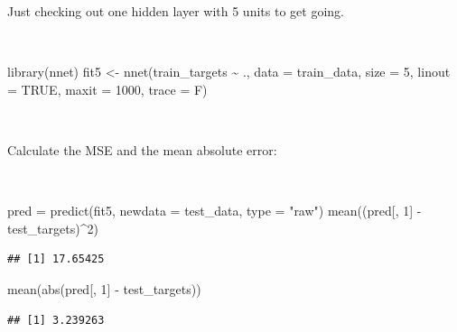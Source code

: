 \documentclass[
  10pt,
  ignorenonframetext,
]{beamer}
\newenvironment{Shaded}{\begin{snugshade}}{\end{snugshade}}
\newcommand{\AttributeTok}[1]{\textcolor[rgb]{0.77,0.63,0.00}{#1}}
\newcommand{\ConstantTok}[1]{\textcolor[rgb]{0.00,0.00,0.00}{#1}}
\newcommand{\DecValTok}[1]{\textcolor[rgb]{0.00,0.00,0.81}{#1}}
\newcommand{\FunctionTok}[1]{\textcolor[rgb]{0.00,0.00,0.00}{#1}}
\newcommand{\NormalTok}[1]{#1}
\newcommand{\OtherTok}[1]{\textcolor[rgb]{0.56,0.35,0.01}{#1}}
\newcommand{\SpecialCharTok}[1]{\textcolor[rgb]{0.00,0.00,0.00}{#1}}
\newcommand{\StringTok}[1]{\textcolor[rgb]{0.31,0.60,0.02}{#1}}
\begin{document}
\begin{frame}[fragile]
Just checking out one hidden layer with 5 units to get going.

\(~\)

\scriptsize

\begin{Shaded}
\begin{Highlighting}[]
\FunctionTok{library}\NormalTok{(nnet)}
\NormalTok{fit5 }\OtherTok{\textless{}{-}} \FunctionTok{nnet}\NormalTok{(train\_targets }\SpecialCharTok{\textasciitilde{}}\NormalTok{ ., }\AttributeTok{data =}\NormalTok{ train\_data, }\AttributeTok{size =} \DecValTok{5}\NormalTok{, }\AttributeTok{linout =} \ConstantTok{TRUE}\NormalTok{,}
    \AttributeTok{maxit =} \DecValTok{1000}\NormalTok{, }\AttributeTok{trace =}\NormalTok{ F)}
\end{Highlighting}
\end{Shaded}

\(~\)

\normalsize

Calculate the MSE and the mean absolute error:

\(~\) \scriptsize

\begin{Shaded}
\begin{Highlighting}[]
\NormalTok{pred }\OtherTok{=} \FunctionTok{predict}\NormalTok{(fit5, }\AttributeTok{newdata =}\NormalTok{ test\_data, }\AttributeTok{type =} \StringTok{"raw"}\NormalTok{)}
\FunctionTok{mean}\NormalTok{((pred[, }\DecValTok{1}\NormalTok{] }\SpecialCharTok{{-}}\NormalTok{ test\_targets)}\SpecialCharTok{\^{}}\DecValTok{2}\NormalTok{)}
\end{Highlighting}
\end{Shaded}

\begin{verbatim}
## [1] 17.65425
\end{verbatim}

\begin{Shaded}
\begin{Highlighting}[]
\FunctionTok{mean}\NormalTok{(}\FunctionTok{abs}\NormalTok{(pred[, }\DecValTok{1}\NormalTok{] }\SpecialCharTok{{-}}\NormalTok{ test\_targets))}
\end{Highlighting}
\end{Shaded}

\begin{verbatim}
## [1] 3.239263
\end{verbatim}
\end{frame}
\end{document}
